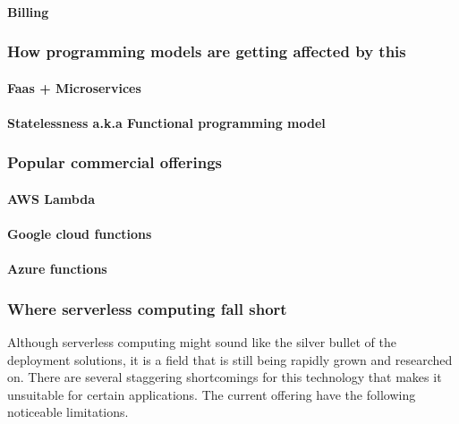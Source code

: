 \documentclass[12pt,titlepage]{article}
\begin{document}
\paragraph{Billing}
\label{sec:org02241b2}

\subsubsection{How programming models are getting affected by this}
\label{sec:orgc340539}
\paragraph{Faas + Microservices}
\label{sec:orgd119a1f}
\paragraph{Statelessness a.k.a Functional programming model}
\label{sec:org04c77b9}
\subsubsection{Popular commercial offerings}
\label{sec:org1049e50}
\paragraph{AWS Lambda}
\label{sec:org34ea423}
\paragraph{Google cloud functions}
\label{sec:orgdd3eea0}
\paragraph{Azure functions}
\label{sec:orged5451e}
\subsubsection{Where serverless computing fall short}
\label{sec:org089ed60}
Although serverless computing might sound like the silver bullet of the
deployment solutions, it is a field that is still being rapidly grown and
researched on. There are several staggering shortcomings for this technology
that makes it unsuitable for certain applications. The current offering have the
following noticeable limitations.
\end{document}
